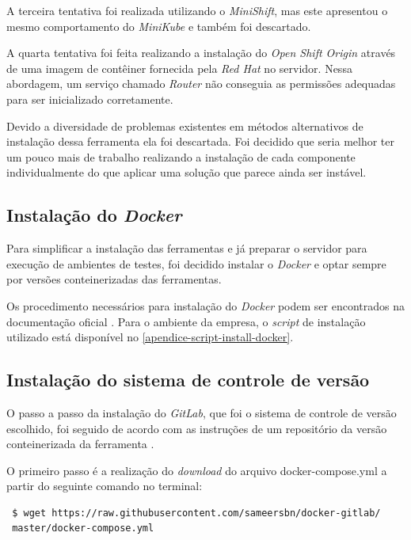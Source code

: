 \documentclass[
12pt,				%
openright,			%
oneside,			%
a4paper,			%
english,			%
french,				%
spanish,			%
brazil,				%
]{abntex2}
\begin{document}
A terceira tentativa foi realizada utilizando o \textit{MiniShift}, mas este apresentou o mesmo comportamento do \textit{MiniKube} e também foi descartado.

A quarta tentativa foi feita realizando a instalação do \textit{Open Shift Origin} através de uma imagem de contêiner fornecida pela \textit{Red Hat} no servidor\cite{OpenShift:InstallGuide}. Nessa abordagem, um serviço chamado \textit{Router} não conseguia as permissões adequadas para ser inicializado corretamente. 

Devido a diversidade de problemas existentes em métodos alternativos de instalação dessa ferramenta ela foi descartada. Foi decidido que seria melhor ter um pouco mais de trabalho realizando a instalação de cada componente individualmente do que aplicar uma solução que parece ainda ser instável.

\subsection{Instalação do \textit{Docker}}

Para simplificar a instalação das ferramentas e já preparar o servidor para execução de ambientes de testes, foi decidido instalar o \textit{Docker} e optar sempre por versões conteinerizadas das ferramentas.

Os procedimento necessários para instalação do \textit{Docker} podem ser encontrados na documentação oficial \cite{Docker:InstallGuide}. Para o ambiente da empresa, o \textit{script} de instalação utilizado está disponível no \autoref{apendice-script-install-docker}.

\subsection{Instalação do sistema de controle de versão}

O passo a passo da instalação do \textit{GitLab}, que foi o sistema de controle de versão escolhido, foi seguido de acordo com as instruções de um repositório da versão conteinerizada da ferramenta \cite{GitHub:GitLabDocker}.

O primeiro passo é a realização do \textit{download} do arquivo docker-compose.yml a partir do seguinte comando no terminal:

\begin{lstlisting}
 $ wget https://raw.githubusercontent.com/sameersbn/docker-gitlab/
 master/docker-compose.yml
\end{lstlisting}
\end{document}
